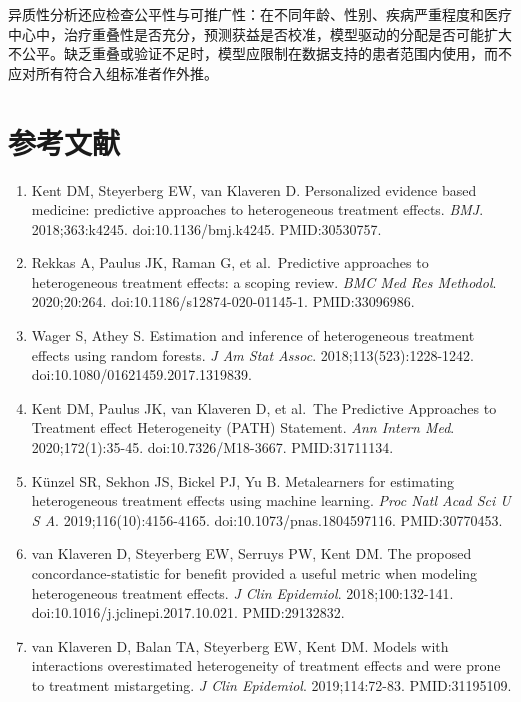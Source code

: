 \documentclass[
  chinese-hans,
  letterpaper,
  DIV=11,
  numbers=noendperiod]{scrreprt}
\begin{document}
异质性分析还应检查公平性与可推广性：在不同年龄、性别、疾病严重程度和医疗中心中，治疗重叠性是否充分，预测获益是否校准，模型驱动的分配是否可能扩大不公平。缺乏重叠或验证不足时，模型应限制在数据支持的患者范围内使用，而不应对所有符合入组标准者作外推。

\section*{参考文献}\label{ux53c2ux8003ux6587ux732e-13}


\begin{enumerate}
\def\labelenumi{\arabic{enumi}.}
\item
  Kent DM, Steyerberg EW, van Klaveren D. Personalized evidence based
  medicine: predictive approaches to heterogeneous treatment effects.
  \emph{BMJ}. 2018;363:k4245. doi:10.1136/bmj.k4245. PMID:30530757.
\item
  Rekkas A, Paulus JK, Raman G, et al.~Predictive approaches to
  heterogeneous treatment effects: a scoping review. \emph{BMC Med Res
  Methodol}. 2020;20:264. doi:10.1186/s12874-020-01145-1. PMID:33096986.
\item
  Wager S, Athey S. Estimation and inference of heterogeneous treatment
  effects using random forests. \emph{J Am Stat Assoc}.
  2018;113(523):1228-1242. doi:10.1080/01621459.2017.1319839.
\item
  Kent DM, Paulus JK, van Klaveren D, et al.~The Predictive Approaches
  to Treatment effect Heterogeneity (PATH) Statement. \emph{Ann Intern
  Med}. 2020;172(1):35-45. doi:10.7326/M18-3667. PMID:31711134.
\item
  Künzel SR, Sekhon JS, Bickel PJ, Yu B. Metalearners for estimating
  heterogeneous treatment effects using machine learning. \emph{Proc
  Natl Acad Sci U S A}. 2019;116(10):4156-4165.
  doi:10.1073/pnas.1804597116. PMID:30770453.
\item
  van Klaveren D, Steyerberg EW, Serruys PW, Kent DM. The proposed
  concordance-statistic for benefit provided a useful metric when
  modeling heterogeneous treatment effects. \emph{J Clin Epidemiol}.
  2018;100:132-141. doi:10.1016/j.jclinepi.2017.10.021. PMID:29132832.
\item
  van Klaveren D, Balan TA, Steyerberg EW, Kent DM. Models with
  interactions overestimated heterogeneity of treatment effects and were
  prone to treatment mistargeting. \emph{J Clin Epidemiol}.
  2019;114:72-83. PMID:31195109.
\end{enumerate}
\end{document}
